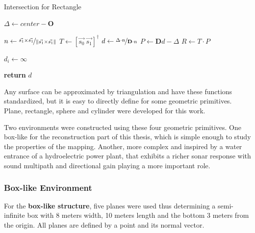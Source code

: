 \begin{algorithm}
\caption{Intersection for Rectangle}
\label{alg:rectangle}
\begin{algorithmic}

\State $\Delta \gets center -
\mathbf{O}$ 

\State $n \gets \nicefrac{\vec{s_1} \times  \vec{s_1}}{\left\lVert\vec{s_1} \times  \vec{s_1}\right\rVert}$
\State $T \gets \left[ \vec{s_0} ~ \vec{s_1} \right]^\dagger$
\State $d \gets \nicefrac{\Delta \cdot n}{\mathbf{D} \cdot n}$
\State $P \gets \mathbf{D}d - \Delta$
\State $R \gets T \cdot P$

\ForAll{$i \in \left[0,\ldots,\text{size}(d)\right)$}
\State $d_i \gets \infty$
\EndIf  
\EndFor


\State \textbf{return} $d$

\EndFunction
\end{algorithmic}
\end{algorithm}

Any surface can be approximated by triangulation and have these functions
standardized, but it is easy to directly define for some geometric primitives. Plane,
rectangle, sphere and cylinder were developed for this work.

Two environments were constructed using these four geometric primitives. One
box-like for the reconstruction part of this thesis, which is simple enough to
study the properties of the mapping. Another, more complex and inspired by a
water entrance of a hydroelectric power plant, that exhibits a richer sonar
response with sound multipath and directional gain playing a more important
role.
\subsubsection{Box-like Environment}
\label{eq:boxlikenv}
For the \textbf{box-like structure}, five planes were used thus determining a
semi-infinite box with 8 meters width, 10 meters length and the bottom 3 meters
from the origin. All planes are defined by a point and its normal vector.

